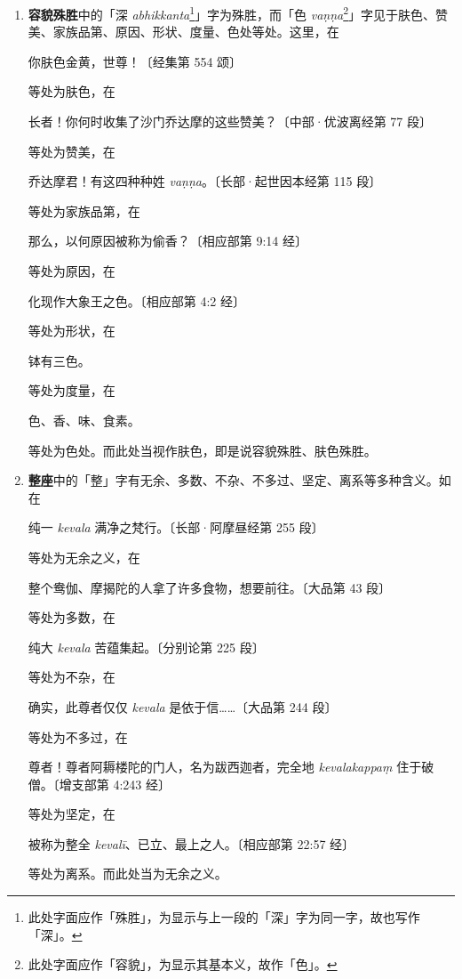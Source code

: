 \begin{enumerate}
\item \textbf{容貌殊胜}中的「深 \textit{abhikkanta}\footnote{此处字面应作「殊胜」，为显示与上一段的「深」字为同一字，故也写作「深」。}」字为殊胜，而「色 \textit{vaṇṇa}\footnote{此处字面应作「容貌」，为显示其基本义，故作「色」。}」字见于肤色、赞美、家族品第、原因、形状、度量、色处等处。这里，在\begin{quoting}你肤色金黄，世尊！{\bluefootnotesize 〔经集第 554 颂〕}\end{quoting}等处为肤色，在\begin{quoting}长者！你何时收集了沙门乔达摩的这些赞美？{\bluefootnotesize 〔中部·优波离经第 77 段〕}\end{quoting}等处为赞美，在\begin{quoting}乔达摩君！有这四种种姓 \textit{vaṇṇa}。{\bluefootnotesize 〔长部·起世因本经第 115 段〕}\end{quoting}等处为家族品第，在\begin{quoting}那么，以何原因被称为偷香？{\bluefootnotesize 〔相应部第 9:14 经〕}\end{quoting}等处为原因，在\begin{quoting}化现作大象王之色。{\bluefootnotesize 〔相应部第 4:2 经〕}\end{quoting}等处为形状，在\begin{quoting}钵有三色。\end{quoting}等处为度量，在\begin{quoting}色、香、味、食素。\end{quoting}等处为色处。而此处当视作肤色，即是说容貌殊胜、肤色殊胜。
\item \textbf{整座}中的「整」字有无余、多数、不杂、不多过、坚定、离系等多种含义。如在\begin{quoting}纯一 \textit{kevala} 满净之梵行。{\bluefootnotesize 〔长部·阿摩昼经第 255 段〕}\end{quoting}等处为无余之义，在\begin{quoting}整个鸯伽、摩揭陀的人拿了许多食物，想要前往。{\bluefootnotesize 〔大品第 43 段〕}\end{quoting}等处为多数，在\begin{quoting}纯大 \textit{kevala} 苦蕴集起。{\bluefootnotesize 〔分别论第 225 段〕}\end{quoting}等处为不杂，在\begin{quoting}确实，此尊者仅仅 \textit{kevala} 是依于信……{\bluefootnotesize 〔大品第 244 段〕}\end{quoting}等处为不多过，在\begin{quoting}尊者！尊者阿耨楼陀的门人，名为跋西迦者，完全地 \textit{kevalakappaṃ} 住于破僧。{\bluefootnotesize 〔增支部第 4:243 经〕}\end{quoting}等处为坚定，在\begin{quoting}被称为整全 \textit{kevalī}、已立、最上之人。{\bluefootnotesize 〔相应部第 22:57 经〕}\end{quoting}等处为离系。而此处当为无余之义。

\end{enumerate}

